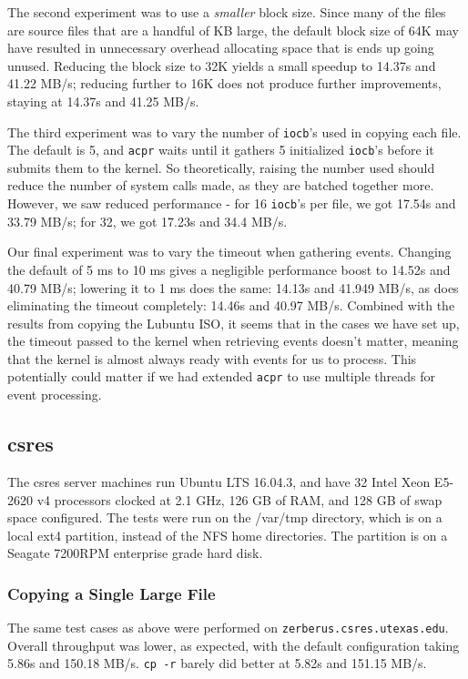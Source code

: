 \documentclass[11pt]{article}
\begin{document}
The second experiment was to use a \textit{smaller} block size. Since many of the files are source files that are a handful of KB large, the default block size of 64K may have resulted in unnecessary overhead allocating space that is ends up going unused. Reducing the block size to 32K yields a small speedup to 14.37s and 41.22 MB/s; reducing further to 16K does not produce further improvements, staying at 14.37s and 41.25 MB/s.

The third experiment was to vary the number of \texttt{iocb}'s used in copying each file. The default is 5, and \texttt{acpr} waits until it gathers 5 initialized \texttt{iocb}'s before it submits them to the kernel. So theoretically, raising the number used should reduce the number of system calls made, as they are batched together more. However, we saw reduced performance - for 16 \texttt{iocb}'s per file, we got 17.54s and 33.79 MB/s; for 32, we got 17.23s and 34.4 MB/s.

Our final experiment was to vary the timeout when gathering events. Changing the default of 5 ms to 10 ms gives a negligible performance boost to 14.52s and 40.79 MB/s; lowering it to 1 ms does the same: 14.13s and 41.949 MB/s, as does eliminating the timeout completely: 14.46s and 40.97 MB/s. Combined with the results from copying the Lubuntu ISO, it seems that in the cases we have set up, the timeout passed to the kernel when retrieving events doesn't matter, meaning that the kernel is almost always ready with events for us to process. This potentially could matter if we had extended \texttt{acpr} to use multiple threads for event processing.

\subsection{csres}
The csres server machines run Ubuntu LTS 16.04.3, and have 32 Intel Xeon E5-2620 v4 processors clocked at 2.1 GHz, 126 GB of RAM, and 128 GB of swap space configured. The tests were run on the /var/tmp directory, which is on a local ext4 partition, instead of the NFS home directories. The partition is on a Seagate 7200RPM enterprise grade hard disk.

\subsubsection{Copying a Single Large File}
The same test cases as above were performed on \texttt{zerberus.csres.utexas.edu}. Overall throughput was lower, as expected, with the default configuration taking 5.86s and 150.18 MB/s. \texttt{cp -r} barely did better at 5.82s and 151.15 MB/s.
\end{document}
